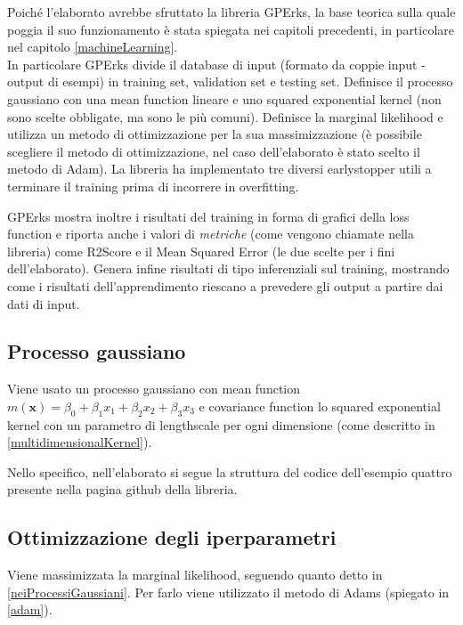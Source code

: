 Poiché l'elaborato avrebbe sfruttato la libreria GPErks, la base teorica sulla quale poggia il suo funzionamento è stata spiegata nei capitoli precedenti, in particolare nel capitolo \ref{machineLearning}.\\

In particolare GPErks divide il database di input (formato da coppie input - output di esempi) in training set, validation set e testing set. Definisce il processo gaussiano con una mean function lineare e uno squared exponential kernel (non sono scelte obbligate, ma sono le più comuni). Definisce la marginal likelihood e utilizza un metodo di ottimizzazione per la sua massimizzazione (è possibile scegliere il metodo di ottimizzazione, nel caso dell'elaborato è stato scelto il metodo di Adam). La libreria ha implementato tre diversi earlystopper utili a terminare il training prima di incorrere in overfitting. 

GPErks mostra inoltre i risultati del training in forma di grafici della loss function e riporta anche i valori di \textit{metriche} (come vengono chiamate nella libreria) come R2Score e il Mean Squared Error (le due scelte per i fini dell'elaborato). Genera infine risultati di tipo inferenziali sul training, mostrando come i risultati dell'apprendimento riescano a prevedere gli output a partire dai dati di input.

\subsection{Processo gaussiano}
Viene usato un processo gaussiano con mean function $m(\mathbf{x})=\beta_0+\beta_1x_1+\beta_2x_2+\beta_3x_3$ e covariance function lo squared exponential kernel con un parametro di lengthscale per ogni dimensione (come descritto in \ref{multidimensionalKernel}).

Nello specifico, nell'elaborato si segue la struttura del codice dell'esempio quattro presente nella pagina github della libreria. 

\subsection{Ottimizzazione degli iperparametri}
Viene massimizzata la marginal likelihood, seguendo quanto detto in \ref{neiProcessiGaussiani}. Per farlo viene utilizzato il metodo di Adams (spiegato in \ref{adam}).

